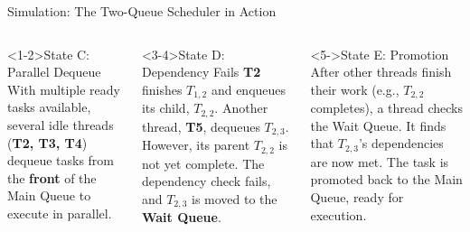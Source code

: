 \begin{frame}{Simulation: The Two-Queue Scheduler in Action}
  \begin{columns}[c,onlytextwidth]

    \begin{alertblock}<1-2>{State C: Parallel Dequeue}
      With multiple ready tasks available, several idle threads (\textbf{T2, T3, T4}) dequeue tasks from the \textbf{front} of the Main Queue to execute in parallel.
    \end{alertblock}
    
    \begin{alertblock}<3-4>{State D: Dependency Fails}
      \textbf{T2} finishes $T_{1,2}$ and enqueues its child, $T_{2,2}$. Another thread, \textbf{T5}, dequeues $T_{2,3}$.
      \vspace{1mm}
      However, its parent $T_{2,2}$ is not yet complete. The dependency check \alert{fails}, and $T_{2,3}$ is moved to the \textbf{Wait Queue}.
    \end{alertblock}

    \begin{alertblock}<5->{State E: Promotion}
      After other threads finish their work (e.g., $T_{2,2}$ completes), a thread checks the Wait Queue.
      \vspace{1mm}
      It finds that $T_{2,3}$'s dependencies are now met. The task is \alert{promoted} back to the Main Queue, ready for execution.
    \end{alertblock}

    \centering
\end{columns}
\end{frame}
